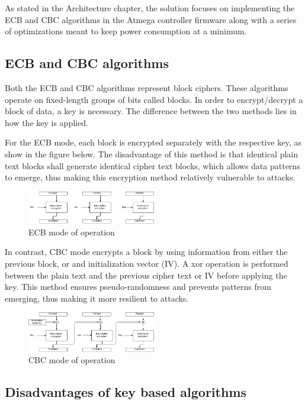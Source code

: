 As stated in the Architecture chapter, the solution focuses on implementing 
the ECB and CBC algorithms in the Atmega controller firmware along with a series 
of optimizations meant to keep power consumption at a minimum.

\subsection{ECB and CBC algorithms}

Both the ECB and CBC algorithms represent block ciphers. These algorithms operate 
on fixed-length groups of bits called blocks. In order to encrypt/decrypt a block 
of data, a key is necessary. The difference between the two methods lies in how 
the key is applied.

For the ECB mode, each block is encrypted separately with the respective key, as 
show in the figure below. The disadvantage of this method is that identical plain text 
blocks shall generate identical cipher text blocks, which allows data patterns to 
emerge, thus making this encryption method relatively vulnerable to attacks.

\begin{figure}[ht] \centering
  \includegraphics[width=0.5\textwidth]{img/ECB-function-mode.png}
  \caption{ECB mode of operation}
\end{figure}

In contrast, CBC mode encrypts a block by using information from either the previous 
block, or and initialization vector (IV). A xor operation is performed between the 
plain text and the previous cipher text or IV before applying the key. This method 
ensures pseudo-randomness and prevents patterns from emerging, thus making it 
more resilient to attacks.

\begin{figure}[ht] \centering
  \includegraphics[width=0.5\textwidth]{img/CBC-function-mode.png}
  \caption{CBC mode of operation}
\end{figure}

\subsection{Disadvantages of key based algorithms}

